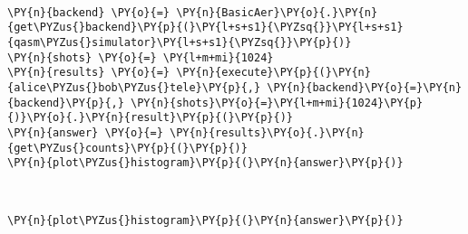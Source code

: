             
    
    \begin{center}
    \end{center}
    { \hspace*{\fill} \\}
    

    \begin{tcolorbox}[breakable, size=fbox, boxrule=1pt, pad at break*=1mm,colback=cellbackground, colframe=cellborder]
\begin{Verbatim}[commandchars=\\\{\}]
\PY{n}{backend} \PY{o}{=} \PY{n}{BasicAer}\PY{o}{.}\PY{n}{get\PYZus{}backend}\PY{p}{(}\PY{l+s+s1}{\PYZsq{}}\PY{l+s+s1}{qasm\PYZus{}simulator}\PY{l+s+s1}{\PYZsq{}}\PY{p}{)}
\PY{n}{shots} \PY{o}{=} \PY{l+m+mi}{1024}
\PY{n}{results} \PY{o}{=} \PY{n}{execute}\PY{p}{(}\PY{n}{alice\PYZus{}bob\PYZus{}tele}\PY{p}{,} \PY{n}{backend}\PY{o}{=}\PY{n}{backend}\PY{p}{,} \PY{n}{shots}\PY{o}{=}\PY{l+m+mi}{1024}\PY{p}{)}\PY{o}{.}\PY{n}{result}\PY{p}{(}\PY{p}{)}
\PY{n}{answer} \PY{o}{=} \PY{n}{results}\PY{o}{.}\PY{n}{get\PYZus{}counts}\PY{p}{(}\PY{p}{)}
\PY{n}{plot\PYZus{}histogram}\PY{p}{(}\PY{n}{answer}\PY{p}{)}
\end{Verbatim}
\end{tcolorbox}
 
            
    
    \begin{center}
    \end{center}
    { \hspace*{\fill} \\}
    

    \begin{tcolorbox}[breakable, size=fbox, boxrule=1pt, pad at break*=1mm,colback=cellbackground, colframe=cellborder]
\begin{Verbatim}[commandchars=\\\{\}]
\PY{n}{plot\PYZus{}histogram}\PY{p}{(}\PY{n}{answer}\PY{p}{)}
\end{Verbatim}
\end{tcolorbox}


    
    